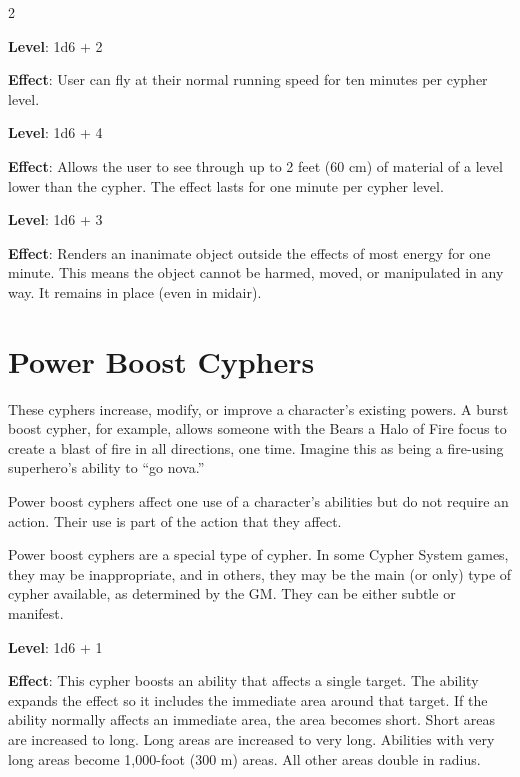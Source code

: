 \begin{multicols}{2}


\textbf{Level}: 1d6 + 2

\textbf{Effect}: User can fly at their normal running speed for ten minutes per cypher level.


\textbf{Level}: 1d6 + 4

\textbf{Effect}: Allows the user to see through up to 2 feet (60 cm) of material of a level lower than the cypher. The effect lasts for one minute per cypher level.


\textbf{Level}: 1d6 + 3

\textbf{Effect}: Renders an inanimate object outside the effects of most energy for one minute. This means the object cannot be harmed, moved, or manipulated in any way. It remains in place (even in midair).

\section{Power Boost Cyphers}

These cyphers increase, modify, or improve a character’s existing powers. A burst boost cypher, for example, allows someone with the Bears a Halo of Fire focus to create a blast of fire in all directions, one time. Imagine this as being a fire-using superhero’s ability to “go nova.”

Power boost cyphers affect one use of a character’s abilities but do not require an action. Their use is part of the action that they affect.

Power boost cyphers are a special type of cypher. In some Cypher System games, they may be inappropriate, and in others, they may be the main (or only) type of cypher available, as determined by the GM. They can be either subtle or manifest.


\textbf{Level}: 1d6 + 1

\textbf{Effect}: This cypher boosts an ability that affects a single target. The ability expands the effect so it includes the immediate area around that target. If the ability normally affects an immediate area, the area becomes short. Short areas are increased to long. Long areas are increased to very long. Abilities with very long areas become 1,000-foot (300 m) areas. All other areas double in radius.


\end{multicols}
